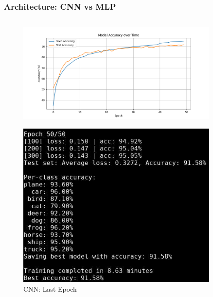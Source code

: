 \begin{frame}
    \frametitle{Architecture: CNN vs MLP}
    \begin{columns}
        \begin{column}{0.5\textwidth}
            \begin{figure}[t]
                \centering
                \vspace{-0.4cm}
                \includegraphics[width=0.9\textwidth]{media/1stAssignment/cifar10_cnn_accuracy.png}
            \end{figure}
            \vspace{-0.8cm}
            \begin{figure}[t]
                \centering
                \includegraphics[width=0.9\textwidth]{media/1stAssignment/cnn_epoch_50.png}
                \vspace{-0.3cm}
                \caption{CNN: Last Epoch}
            \end{figure}
        \end{column}
    

\end{columns}
\end{frame}
